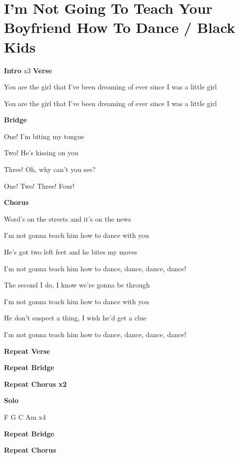 \section{I'm Not Going To Teach Your Boyfriend How To Dance / Black Kids}\label{sec:imnotgoingtoteachyourboyfriendhowtodance}

  \Fmajor
  \Gmajor
  \Cmajor
  \Aminor  
  
 \textbf{Intro}
        x3
 \textbf{Verse}
                                                                       
You are the girl that I've been dreaming of ever since I was a little girl

You are the girl that I've been dreaming of ever since I was a little girl

\textbf{Bridge}

One! I'm biting my tongue

Two! He's kissing on you

Three! Oh, why can't you see?

One! Two! Three! Four!

\textbf{Chorus}           
                            
Word's on the streets and it's on the news   
                                             
I'm not gonna teach him how to dance with you  
                         
He's got two left feet and he bites my moves  
                                       	
I'm not gonna teach him how to dance, dance, dance, dance! 
                                    
The second I do, I know we're gonna be through   
                                      
I'm not gonna teach him how to dance with you  
                                  
He don't suspect a thing, I wish he'd get a clue      
                                   
I'm not gonna teach him how to dance, dance, dance, dance!

\textbf{Repeat Verse}

\textbf{Repeat Bridge}

\textbf{Repeat Chorus x2}

\textbf{Solo}

 F  G  C  Am x4
 
\textbf{Repeat Bridge}

\textbf{Repeat Chorus}
